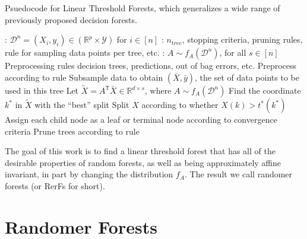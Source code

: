 \documentclass{article} %
\newcommand{\Real}{\mathbb{R}}
\providecommand{\mc}[1]{\mathcal{#1}}
\providecommand{\mt}[1]{\widetilde{#1}}
\newcommand{\T}{^{\ensuremath{\mathsf{T}}}}           %
\begin{document}
\begin{algorithm}
\caption{Psuedocode for Linear Threshold Forests, which generalizes a wide range of previously proposed decision forests.} \label{pseudo}
\begin{algorithmic}[1]
\Require 
: $\mc{D}^n = (X_i,y_i) \in (\Real^p \times \mc{Y})$ for $i \in [n]$
:  $n_{tree}$, stopping criteria, pruning rules, rule for sampling data points per tree, etc.
: $A \sim f_A(\mc{D}^n)$, for all $s \in [n]$
\State Preprocessing rules
\Ensure decision trees, predictions, out of bag errors, etc. 
\State Preprocess according to rule
\State Subsample data to obtain $(\bar{X},\bar{y})$, the set of data points to be used in this tree
\State Let $\mt{X} =  A\T \bar{X} \in \Real^{d \times s}$, where $A \sim f_A(\mc{D}^n)$
\State Find the coordinate $k^*$ in $\mt{X}$ with the ``best'' split
\State Split $X$ according to whether $X(k) > t^*(k^*)$
\State Assign each child node as a leaf or terminal  node according to convergence criteria
\EndFor
\EndFor
\State Prune trees according to rule
\end{algorithmic}
\end{algorithm}

The goal of this work is to find a linear threshold forest that has all of the desirable properties of random forests, as well as being approximately affine invariant, in part by changing the distribution $f_A$. The result we call randomer forests (or RerFs for short).


\section{Randomer Forests}
\end{document}
